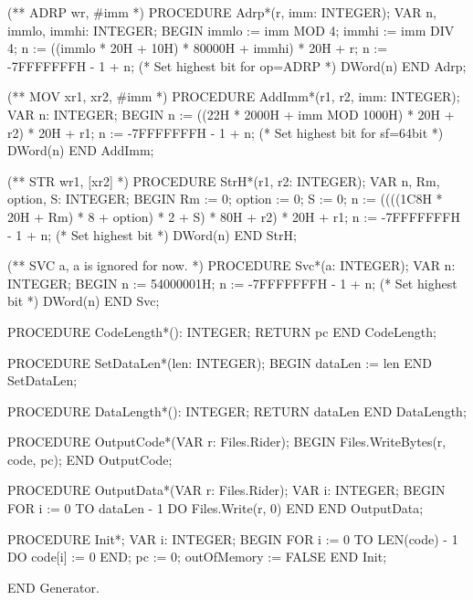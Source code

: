 \documentclass[utf8]{lgu}
\begin{document}
\begin{modula2long}
(** ADRP w{r}, #{imm} *)
PROCEDURE Adrp*(r, imm: INTEGER);
VAR n, immlo, immhi: INTEGER;
BEGIN
  immlo := imm MOD 4;
  immhi := imm DIV 4;
  n := ((immlo * 20H + 10H) * 80000H + immhi) * 20H + r;
  n := -7FFFFFFFH - 1 + n; (* Set highest bit for op=ADRP *)
  DWord(n)
END Adrp;

(** MOV x{r1}, x{r2}, #{imm} *)
PROCEDURE AddImm*(r1, r2, imm: INTEGER);
VAR n: INTEGER;
BEGIN
  n := ((22H * 2000H + imm MOD 1000H) * 20H + r2) * 20H + r1;
  n := -7FFFFFFFH - 1 + n; (* Set highest bit for sf=64bit *)
  DWord(n)
END AddImm;

(** STR w{r1}, [x{r2}] *)
PROCEDURE StrH*(r1, r2: INTEGER);
VAR n, Rm, option, S: INTEGER;
BEGIN
  Rm := 0;
  option := 0;
  S := 0;
  n := ((((1C8H * 20H + Rm) * 8 + option) * 2 + S) * 80H + r2) * 20H + r1;
  n := -7FFFFFFFH - 1 + n; (* Set highest bit *)
  DWord(n)
END StrH;

(** SVC {a}, a is ignored for now. *)
PROCEDURE Svc*(a: INTEGER);
VAR n: INTEGER;
BEGIN
  n := 54000001H;
  n := -7FFFFFFFH - 1 + n; (* Set highest bit *)
  DWord(n)
END Svc;

PROCEDURE CodeLength*(): INTEGER;
RETURN pc END CodeLength;

PROCEDURE SetDataLen*(len: INTEGER);
BEGIN
  dataLen := len
END SetDataLen;

PROCEDURE DataLength*(): INTEGER;
RETURN dataLen END DataLength;

PROCEDURE OutputCode*(VAR r: Files.Rider);
BEGIN
  Files.WriteBytes(r, code, pc);
END OutputCode;

PROCEDURE OutputData*(VAR r: Files.Rider);
VAR i: INTEGER;
BEGIN
  FOR i := 0 TO dataLen - 1 DO Files.Write(r, 0) END
END OutputData;

PROCEDURE Init*;
VAR i: INTEGER;
BEGIN
  FOR i := 0 TO LEN(code) - 1 DO code[i] := 0 END;
  pc := 0;
  outOfMemory := FALSE
END Init;

END Generator.
\end{modula2long}

\newpage
\end{document}
